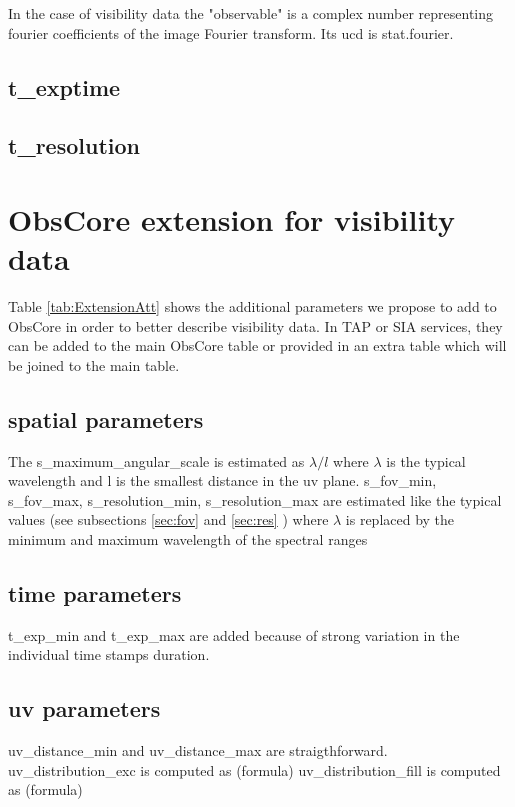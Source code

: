 \documentclass[11pt,a4paper]{ivoa}
\begin{document}
In the case of visibility data the "observable" is a complex number representing fourier coefficients of the image Fourier transform. Its ucd is stat.fourier. 

\subsection{t\_exptime}

\subsection{t\_resolution}


\section{ObsCore extension for visibility data}

Table \ref{tab:ExtensionAtt} shows the additional parameters we propose to add to ObsCore in order to better describe visibility data.
In TAP or SIA services, they can be added to the main ObsCore table or provided in an extra table which will be joined to the main table. 
\subsection{spatial parameters}

The s\_maximum\_angular\_scale is estimated as $\lambda/l$ where $\lambda$ is the typical wavelength and l is the smallest distance in the uv plane. s\_fov\_min, s\_fov\_max, s\_resolution\_min, s\_resolution\_max are estimated like the typical values (see subsections \ref{sec:fov} and \ref{sec:res} ) where $\lambda$ is replaced by the minimum and maximum wavelength of the spectral ranges

\subsection{time parameters}

t\_exp\_min and t\_exp\_max are added because of strong variation in the individual time stamps duration.

\subsection{uv parameters}
uv\_distance\_min and uv\_distance\_max are straigthforward.
uv\_distribution\_exc is computed as (formula)
uv\_distribution\_fill is computed as (formula)
\end{document}
